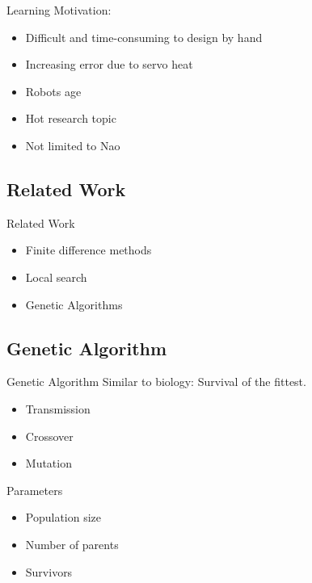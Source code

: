 \documentclass{beamer}
\begin{document}
\begin{frame}{Learning}
	Motivation:
	\begin{itemize}
		\item Difficult and time-consuming to design by hand
		\item Increasing error due to servo heat
		\item Robots age
		\item Hot research topic
		\item Not limited to Nao
	\end{itemize}
\end{frame}

\subsection{Related Work}
\begin{frame}{Related Work}
    \begin{itemize}
		\item Finite difference methods \cite{macalpineusing, meijer2012getting}
		\item Local search
        \item Genetic Algorithms \cite{meijer2012getting}
	\end{itemize}
\end{frame}

\subsection{Genetic Algorithm}
\begin{frame}{Genetic Algorithm}
	Similar to biology: Survival of the fittest.
    \begin{itemize}
		\item Transmission
		\item Crossover
		\item Mutation
	\end{itemize}


    Parameters
	\begin{itemize}
		\item Population size 
		\item Number of parents
		\item Survivors
	\end{itemize}
\end{frame}
\end{document}
